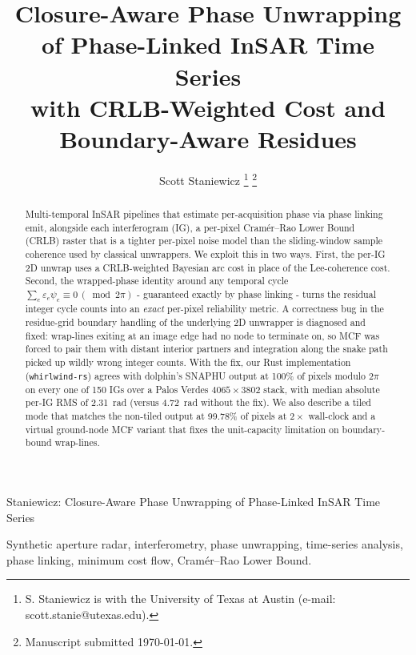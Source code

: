 \documentclass[journal]{IEEEtran}
\begin{document}
\title{Closure-Aware Phase Unwrapping of Phase-Linked InSAR Time Series\\
       with CRLB-Weighted Cost and Boundary-Aware Residues}

\author{Scott Staniewicz%
\thanks{S. Staniewicz is with the University of Texas at Austin
        (e-mail: scott.stanie@utexas.edu).}%
\thanks{Manuscript submitted \today.}%
}

%
{Staniewicz: Closure-Aware Phase Unwrapping of Phase-Linked InSAR Time Series}

\maketitle


\begin{abstract}
Multi-temporal InSAR pipelines that estimate per-acquisition phase via phase
linking emit, alongside each interferogram (IG), a per-pixel
Cram\'er--Rao Lower Bound (CRLB) raster that is a tighter per-pixel
noise model than the sliding-window sample coherence used by classical
unwrappers. We exploit this in two ways. First, the per-IG 2D unwrap uses
a CRLB-weighted Bayesian arc cost in place of the Lee-coherence cost.
Second, the wrapped-phase identity around any temporal cycle
$\sum_e\varepsilon_e\psi_e\equiv 0\,(\bmod 2\pi)$ - guaranteed exactly by
phase linking - turns the residual integer cycle counts into an
\emph{exact} per-pixel reliability metric. A correctness bug in the
residue-grid boundary handling of the underlying 2D unwrapper is
diagnosed and fixed: wrap-lines exiting at an image edge had no node to
terminate on, so MCF was forced to pair them with distant interior
partners and integration along the snake path picked up wildly wrong
integer counts. With the fix, our Rust implementation
(\texttt{whirlwind-rs}) agrees with dolphin's SNAPHU output at 100\%
of pixels modulo $2\pi$ on every one of 150 IGs over a Palos Verdes
$4065\times 3802$ stack, with median absolute per-IG RMS of 2.31~rad
(versus 4.72~rad without the fix). We also describe a tiled mode that
matches the non-tiled output at 99.78\% of pixels at $2\times$ wall-clock
and a virtual ground-node MCF variant that fixes the unit-capacity
limitation on boundary-bound wrap-lines.
\end{abstract}

\begin{IEEEkeywords}
Synthetic aperture radar, interferometry, phase unwrapping, time-series
analysis, phase linking, minimum cost flow, Cram\'er--Rao Lower Bound.
\end{IEEEkeywords}
\end{document}
